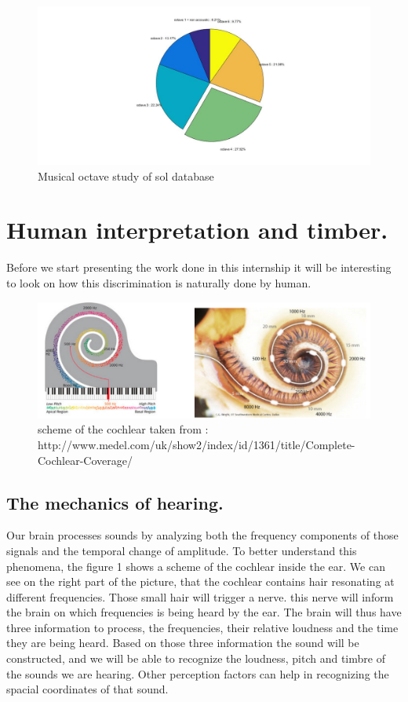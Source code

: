 \documentclass[hidelinks,12pt]{report}
\begin{document}
\begin{figure}[t!]
  
  \centering
	    \includegraphics[width=1\textwidth]{byoctave}
    \caption{Musical octave study of sol database}
\end{figure}


\section{Human interpretation and timber.}

Before we start presenting the work done in this internship it will be interesting to look on how this discrimination is naturally done by human.\par
\begin{figure}[t!]
  
  \centering
	    \includegraphics[width=1\textwidth]{cochlear}
    \caption{scheme of the cochlear taken from : http://www.medel.com/uk/show2/index/id/1361/title/Complete-Cochlear-Coverage/}
\end{figure}
\subsection{The mechanics of hearing.}
Our brain processes sounds by analyzing both the frequency components of those signals and the temporal change of amplitude. To better understand this phenomena, the figure 1 shows a scheme of the cochlear inside the ear. We can see on the right part of the picture, that the cochlear contains hair resonating  at different frequencies. Those small hair will trigger a nerve. this nerve will inform the brain on which frequencies is being heard by the ear. The brain will thus have three information to process, the frequencies, their relative loudness and the time they are being heard. Based on those three information the sound will be constructed, and we will be able to   
recognize the loudness, pitch and timbre of the sounds we are hearing. Other perception factors can help in recognizing the spacial coordinates   of that sound.
\end{document}
